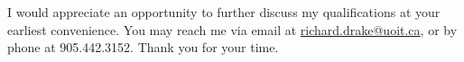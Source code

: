 \documentclass[letterpaper,12pt]{moderncv}
\begin{document}
	I would appreciate an opportunity to further discuss my qualifications at your earliest convenience.  You may reach me via email at \href{mailto:richard.drake@uoit.ca}{richard.drake@uoit.ca}, or by phone at 905.442.3152. Thank you for your time.
	
	\makeletterclosing
\end{document}
